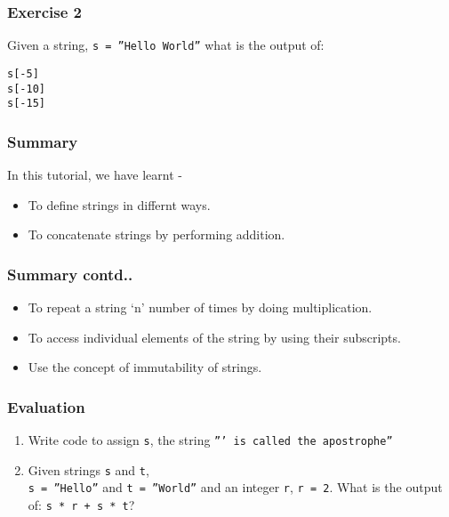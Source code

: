 \documentclass[17pt,compress]{beamer}
\newcounter{saveenumi}
\newcommand{\seti}{\setcounter{saveenumi}{\value{enumi}}}
\begin{document}
\begin{frame}[fragile]
\frametitle{Exercise 2}
\label{sec-4}

  Given a string, \texttt{s = ''Hello World''}  what is the output of:
\lstset{language=Python}
\begin{lstlisting}
s[-5]
s[-10]
s[-15]
\end{lstlisting}
\end{frame}
\begin{frame}
\frametitle{Summary}
\label{sec-5.1}

  In this tutorial, we have learnt -

\begin{itemize}
\item To define strings in differnt ways.
\item To concatenate strings by performing addition.
\end{itemize}
\end{frame}
\begin{frame}
\frametitle{Summary contd..}
\label{sec-5.2}

\begin{itemize}
\item To repeat a string `n' number of times by doing multiplication.
\item To access individual elements of the string by using their subscripts.
\item Use the concept of immutability of strings.
\end{itemize}
\end{frame}
\begin{frame}
\frametitle{Evaluation}
\label{sec-6.1}


\begin{enumerate}
\item Write code to assign \texttt{s}, the string \texttt{''' is called the apostrophe''}\pause
\vspace{8pt}
\item Given strings \texttt{s} and \texttt{t},\\ \texttt{s = ''Hello''} and \texttt{t = ''World''} and an
   integer \texttt{r}, \texttt{r = 2}. What is the output of: \texttt{s * r + s * t}? 
\seti
\end{enumerate}
\end{frame}
\end{document}
